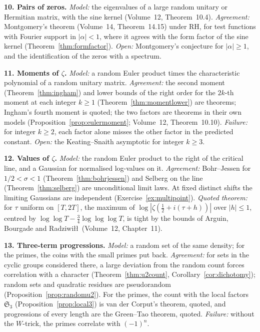 \medskip\noindent\textbf{10. Pairs of zeros.} \emph{Model:} the eigenvalues of a large random unitary or Hermitian matrix, with the sine kernel (Volume~12, Theorem~10.4). \emph{Agreement:} Montgomery's theorem (Volume~14, Theorem~14.15) under RH, for test functions with Fourier support in $|\alpha|<1$, where it agrees with the form factor of the sine kernel (Theorem~\ref{thm:formfactor}). \emph{Open:} Montgomery's conjecture for $|\alpha|\ge1$, and the identification of the zeros with a spectrum.

\medskip\noindent\textbf{11. Moments of $\zeta$.} \emph{Model:} a random Euler product times the characteristic polynomial of a random unitary matrix. \emph{Agreement:} the second moment (Theorem~\ref{thm:ingham}) and lower bounds of the right order for the $2k$-th moment at each integer $k\ge1$ (Theorem~\ref{thm:momentlower}) are theorems; Ingham's fourth moment is quoted; the two factors are theorems in their own models (Proposition~\ref{prop:eulermoment}; Volume~12, Theorem~10.10). \emph{Failure:} for integer $k\ge2$, each factor alone misses the other factor in the predicted constant. \emph{Open:} the Keating--Snaith asymptotic for integer $k\ge3$.

\medskip\noindent\textbf{12. Values of $\zeta$.} \emph{Model:} the random Euler product to the right of the critical line, and a Gaussian for normalised log-values on it. \emph{Agreement:} Bohr--Jessen for $1/2<\sigma<1$ (Theorem~\ref{thm:bohrjessen}) and Selberg on the line (Theorem~\ref{thm:selberg}) are unconditional limit laws. At fixed distinct shifts the limiting Gaussians are independent (Exercise~\ref{ex:multipoint}). \emph{Quoted theorem:} for $\tau$ uniform on $[T,2T]$, the maximum of $\log|\zeta(\tfrac12+i(\tau+h))|$ over $|h|\le1$, centred by $\log\log T-\tfrac34\log\log\log T$, is tight by the bounds of Arguin, Bourgade and Radziwi\l\l\ (Volume~12, Chapter~11).

\medskip\noindent\textbf{13. Three-term progressions.} \emph{Model:} a random set of the same density; for the primes, the coins with the small primes put back. \emph{Agreement:} for sets in the cyclic groups considered there, a large deviation from the random count forces correlation with a character (Theorem~\ref{thm:u2count}, Corollary~\ref{cor:dichotomy}); random sets and quadratic residues are pseudorandom (Proposition~\ref{prop:randomu2}). For the primes, the count with the local factors $\mathfrak S_3$ (Proposition~\ref{prop:local3}) is van der Corput's theorem, quoted, and progressions of every length are the Green--Tao theorem, quoted. \emph{Failure:} without the $W$-trick, the primes correlate with $(-1)^n$.

